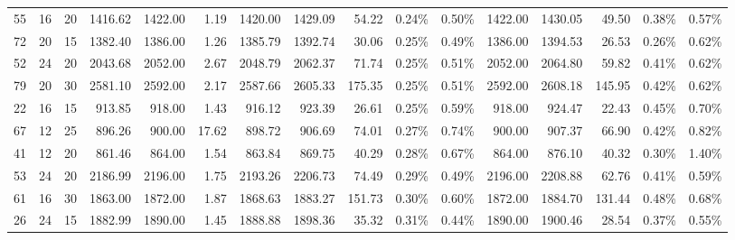 \begin{tabular}{lllrrrrrrllrrrll}
55 &  16 &  20 &   1416.62 &    1422.00 &        1.19 &       1420.00 &        1429.09 &           54.22 &            0.24\% &             0.50\% &       1422.00 &        1430.05 &           49.50 &            0.38\% &             0.57\% \\
72 &  20 &  15 &   1382.40 &    1386.00 &        1.26 &       1385.79 &        1392.74 &           30.06 &            0.25\% &             0.49\% &       1386.00 &        1394.53 &           26.53 &            0.26\% &             0.62\% \\
52 &  24 &  20 &   2043.68 &    2052.00 &        2.67 &       2048.79 &        2062.37 &           71.74 &            0.25\% &             0.51\% &       2052.00 &        2064.80 &           59.82 &            0.41\% &             0.62\% \\
79 &  20 &  30 &   2581.10 &    2592.00 &        2.17 &       2587.66 &        2605.33 &          175.35 &            0.25\% &             0.51\% &       2592.00 &        2608.18 &          145.95 &            0.42\% &             0.62\% \\
22 &  16 &  15 &    913.85 &     918.00 &        1.43 &        916.12 &         923.39 &           26.61 &            0.25\% &             0.59\% &        918.00 &         924.47 &           22.43 &            0.45\% &             0.70\% \\
67 &  12 &  25 &    896.26 &     900.00 &       17.62 &        898.72 &         906.69 &           74.01 &            0.27\% &             0.74\% &        900.00 &         907.37 &           66.90 &            0.42\% &             0.82\% \\
41 &  12 &  20 &    861.46 &     864.00 &        1.54 &        863.84 &         869.75 &           40.29 &            0.28\% &             0.67\% &        864.00 &         876.10 &           40.32 &            0.30\% &             1.40\% \\
53 &  24 &  20 &   2186.99 &    2196.00 &        1.75 &       2193.26 &        2206.73 &           74.49 &            0.29\% &             0.49\% &       2196.00 &        2208.88 &           62.76 &            0.41\% &             0.59\% \\
61 &  16 &  30 &   1863.00 &    1872.00 &        1.87 &       1868.63 &        1883.27 &          151.73 &            0.30\% &             0.60\% &       1872.00 &        1884.70 &          131.44 &            0.48\% &             0.68\% \\
26 &  24 &  15 &   1882.99 &    1890.00 &        1.45 &       1888.88 &        1898.36 &           35.32 &            0.31\% &             0.44\% &       1890.00 &        1900.46 &           28.54 &            0.37\% &             0.55\% \\

\end{tabular}
